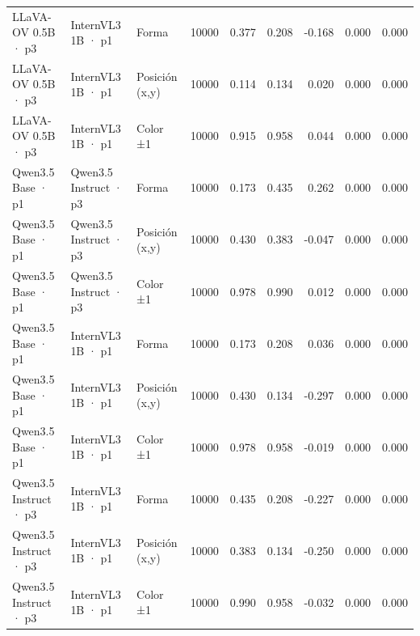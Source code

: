 \begin{tabular}{lllrrrrrr}
LLaVA-OV 0.5B · p3 & InternVL3 1B · p1 & Forma & 10000 & 0.377 & 0.208 & -0.168 & 0.000 & 0.000 \\
LLaVA-OV 0.5B · p3 & InternVL3 1B · p1 & Posición (x,y) & 10000 & 0.114 & 0.134 & 0.020 & 0.000 & 0.000 \\
LLaVA-OV 0.5B · p3 & InternVL3 1B · p1 & Color ±1 & 10000 & 0.915 & 0.958 & 0.044 & 0.000 & 0.000 \\
Qwen3.5 Base · p1 & Qwen3.5 Instruct · p3 & Forma & 10000 & 0.173 & 0.435 & 0.262 & 0.000 & 0.000 \\
Qwen3.5 Base · p1 & Qwen3.5 Instruct · p3 & Posición (x,y) & 10000 & 0.430 & 0.383 & -0.047 & 0.000 & 0.000 \\
Qwen3.5 Base · p1 & Qwen3.5 Instruct · p3 & Color ±1 & 10000 & 0.978 & 0.990 & 0.012 & 0.000 & 0.000 \\
Qwen3.5 Base · p1 & InternVL3 1B · p1 & Forma & 10000 & 0.173 & 0.208 & 0.036 & 0.000 & 0.000 \\
Qwen3.5 Base · p1 & InternVL3 1B · p1 & Posición (x,y) & 10000 & 0.430 & 0.134 & -0.297 & 0.000 & 0.000 \\
Qwen3.5 Base · p1 & InternVL3 1B · p1 & Color ±1 & 10000 & 0.978 & 0.958 & -0.019 & 0.000 & 0.000 \\
Qwen3.5 Instruct · p3 & InternVL3 1B · p1 & Forma & 10000 & 0.435 & 0.208 & -0.227 & 0.000 & 0.000 \\
Qwen3.5 Instruct · p3 & InternVL3 1B · p1 & Posición (x,y) & 10000 & 0.383 & 0.134 & -0.250 & 0.000 & 0.000 \\
Qwen3.5 Instruct · p3 & InternVL3 1B · p1 & Color ±1 & 10000 & 0.990 & 0.958 & -0.032 & 0.000 & 0.000 \\
\bottomrule
\end{tabular}
